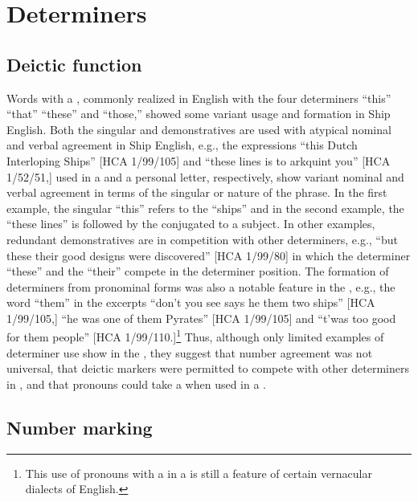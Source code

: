 \section{{Determiners}}%

\subsection{{Deictic function}}%

Words with a , commonly realized in English with the four  determiners “this” “that” “these” and “those,” showed some variant usage and formation in Ship English. Both the singular and  demonstratives are used with atypical nominal and verbal agreement in Ship English, e.g., the expressions “this Dutch Interloping Ships” [HCA 1/99/105] and “these lines is to arkquint you” [HCA 1/52/51,] used in a  and a personal letter, respectively, show variant nominal and verbal agreement in terms of the singular or  nature of the  phrase. In the first example, the singular  “this” refers to the   “ships” and in the second example, the    “these lines” is followed by the   conjugated to a  subject. In other examples, redundant demonstratives are in competition with other determiners, e.g., “but these their good designs were discovered” [HCA 1/99/80] in which the determiner “these” and the  “their” compete in the determiner position. The formation of  determiners from  pronominal forms was also a notable feature in the , e.g., the word “them” in the excerpts “don’t you see says he them two ships” [HCA 1/99/105,] “he was one of them Pyrates” [HCA 1/99/105] and “t’was too good for them people” [HCA 1/99/110.]\footnote{This use of  pronouns with a  in a  is still a feature of certain vernacular dialects of English.} Thus, although only limited examples of determiner use show in the , they suggest that  number agreement was not universal, that deictic markers were permitted to compete with other determiners in , and that  pronouns could take a  when used in a .  

\subsection{{Number marking}}%

